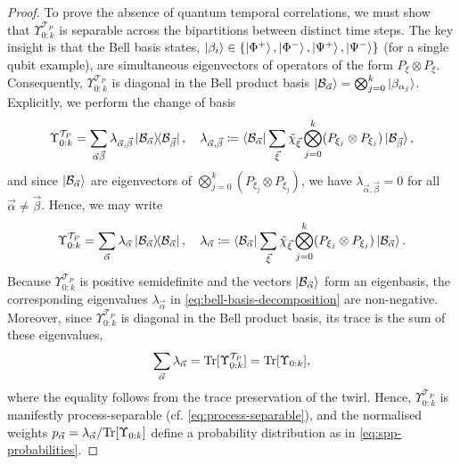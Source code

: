 \begin{proof}
    To prove the absence of quantum temporal correlations, we must show that \(\Upsilon_{0:k}^{\mathcal{T}_P}\) is separable across the bipartitions between distinct time steps. The key insight is that the Bell basis states, \(\ket{\beta_i} \in \{\ket{\Phi^+}, \ket{\Phi^-}, \ket{\Psi^+}, \ket{\Psi^-}\}\) (for a single qubit example), are simultaneous eigenvectors of operators of the form \(P_\xi \otimes P_\xi\). Consequently, \(\Upsilon_{0:k}^{\mathcal{T}_P}\) is diagonal in the Bell product basis \(\ket{\mathcal{B}_{\vec{\alpha}}}=\bigotimes_{j=0}^k \ket{\beta_{\alpha_j}}\). Explicitly, we perform the change of basis
    \begin{equation}
        \Upsilon_{0:k}^{\mathcal{T}_P} = \sum_{{\vec{\alpha}}{\vec{\beta}}} \lambda_{\vec{\alpha},\vec{\beta}} \ket{\mathcal{B}_{\vec{\alpha}}}\!\!\bra{\mathcal{B}_{\vec{\beta}}},
        \quad
        \lambda_{\vec{\alpha},\vec{\beta}} \coloneq \bra{\mathcal{B}_{\vec{\alpha}}} 
        \sum_{\vec{\xi}} \tilde{\chi}_{\vec{\xi}} \bigotimes_{j=0}^k (P_{\xi_j} \otimes P_{\xi_j})
        \ket{\mathcal{B}_{\vec{\beta}}},
    \end{equation}
    and since \(\ket{\mathcal{B}_{\vec{\alpha}}}\) are eigenvectors of \(\bigotimes_{j=0}^k (P_{\xi_j} \otimes P_{\xi_j})\), we have \(\lambda_{\vec{\alpha},\vec{\beta}} = 0\) for all \(\vec{\alpha} \neq \vec{\beta}\). Hence, we may write
    \begin{equation}\label{eq:bell-basis-decomposition}
        \Upsilon_{0:k}^{\mathcal{T}_P} = \sum_{\vec{\alpha}} \lambda_{\vec{\alpha}} \ket{\mathcal{B}_{\vec{\alpha}}}\!\!\bra{\mathcal{B}_{\vec{\alpha}}},
        \quad
        \lambda_{\vec{\alpha}} \coloneq \bra{\mathcal{B}_{\vec{\alpha}}} 
        \sum_{\vec{\xi}} \tilde{\chi}_{\vec{\xi}} \bigotimes_{j=0}^k (P_{\xi_j} \otimes P_{\xi_j})
        \ket{\mathcal{B}_{\vec{\alpha}}}.
    \end{equation}
    Because \(\Upsilon_{0:k}^{\mathcal{T}_P}\) is positive semidefinite and the vectors \(\ket{\mathcal{B}_{\vec{\alpha}}}\) form an eigenbasis, the corresponding eigenvalues \(\lambda_{\vec{\alpha}}\) in \cref{eq:bell-basis-decomposition} are non-negative. Moreover, since \(\Upsilon_{0:k}^{\mathcal{T}_P}\) is diagonal in the Bell product basis, its trace is the sum of these eigenvalues,
    \begin{equation}
        \sum_{\vec{\alpha}} \lambda_{\vec{\alpha}} = \mathrm{Tr}[\Upsilon_{0:k}^{\mathcal{T}_P}] = \mathrm{Tr}[\Upsilon_{0:k}],
    \end{equation}
    where the equality follows from the trace preservation of the twirl. Hence, \(\Upsilon_{0:k}^{\mathcal{T}_P}\) is manifestly process-separable (cf. \cref{eq:process-separable}), and the normalised weights \(p_{\vec{\alpha}} = \lambda_{\vec{\alpha}} / \mathrm{Tr}[\Upsilon_{0:k}]\) define a probability distribution as in \cref{eq:spp-probabilities}.


\end{proof}
